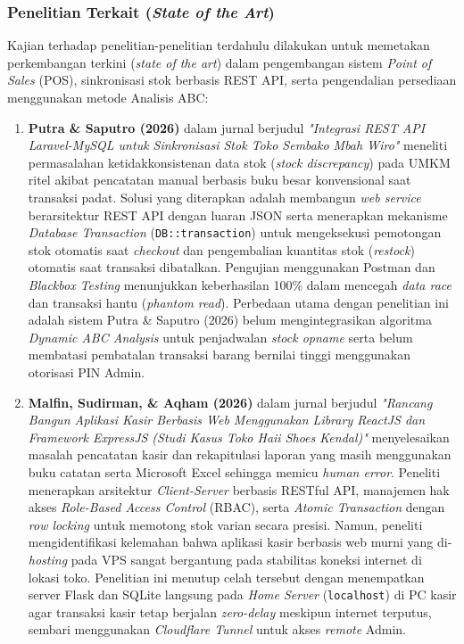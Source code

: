 \documentclass[11pt, a4paper]{article}
\begin{document}
\subsubsection{Penelitian Terkait (\textit{State of the Art})}
Kajian terhadap penelitian-penelitian terdahulu dilakukan untuk memetakan perkembangan terkini (\textit{state of the art}) dalam pengembangan sistem \textit{Point of Sales} (POS), sinkronisasi stok berbasis REST API, serta pengendalian persediaan menggunakan metode Analisis ABC:

\begin{enumerate}[label=\arabic*.]
    \item \textbf{Putra \& Saputro (2026)} dalam jurnal berjudul \textit{"Integrasi REST API Laravel-MySQL untuk Sinkronisasi Stok Toko Sembako Mbah Wiro"} meneliti permasalahan ketidakkonsistenan data stok (\textit{stock discrepancy}) pada UMKM ritel akibat pencatatan manual berbasis buku besar konvensional saat transaksi padat. Solusi yang diterapkan adalah membangun \textit{web service} berarsitektur REST API dengan luaran JSON serta menerapkan mekanisme \textit{Database Transaction} (\texttt{DB::transaction}) untuk mengeksekusi pemotongan stok otomatis saat \textit{checkout} dan pengembalian kuantitas stok (\textit{restock}) otomatis saat transaksi dibatalkan. Pengujian menggunakan Postman dan \textit{Blackbox Testing} menunjukkan keberhasilan 100\% dalam mencegah \textit{data race} dan transaksi hantu (\textit{phantom read}). Perbedaan utama dengan penelitian ini adalah sistem Putra \& Saputro (2026) belum mengintegrasikan algoritma \textit{Dynamic ABC Analysis} untuk penjadwalan \textit{stock opname} serta belum membatasi pembatalan transaksi barang bernilai tinggi menggunakan otorisasi PIN Admin.
    \item \textbf{Malfin, Sudirman, \& Aqham (2026)} dalam jurnal berjudul \textit{"Rancang Bangun Aplikasi Kasir Berbasis Web Menggunakan Library ReactJS dan Framework ExpressJS (Studi Kasus Toko Haii Shoes Kendal)"} menyelesaikan masalah pencatatan kasir dan rekapitulasi laporan yang masih menggunakan buku catatan serta Microsoft Excel sehingga memicu \textit{human error}. Peneliti menerapkan arsitektur \textit{Client-Server} berbasis RESTful API, manajemen hak akses \textit{Role-Based Access Control} (RBAC), serta \textit{Atomic Transaction} dengan \textit{row locking} untuk memotong stok varian secara presisi. Namun, peneliti mengidentifikasi kelemahan bahwa aplikasi kasir berbasis web murni yang di-\textit{hosting} pada VPS sangat bergantung pada stabilitas koneksi internet di lokasi toko. Penelitian ini menutup celah tersebut dengan menempatkan server Flask dan SQLite langsung pada \textit{Home Server} (\texttt{localhost}) di PC kasir agar transaksi kasir tetap berjalan \textit{zero-delay} meskipun internet terputus, sembari menggunakan \textit{Cloudflare Tunnel} untuk akses \textit{remote} Admin.

\end{enumerate}
\end{document}
